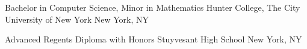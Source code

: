 

\begin{cventries}


  \cventrynoitems
    {Bachelor in Computer Science, Minor in Mathematics} %
    {Hunter College, The City University of New York} %
    {New York, NY} %
    {} %

  \cventrynoitems
    {Advanced Regents Diploma with Honors} %
    {Stuyvesant High School} %
    {New York, NY} %
    {} %

\end{cventries}
